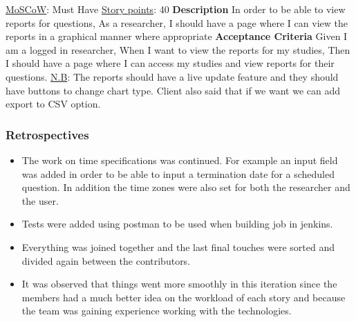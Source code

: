 \documentclass[12pt, a4paper]{report}
\begin{document}
\begin{tcolorbox}[width=\textwidth,colback={White},title={\textbf {Adding reports to website}},colbacktitle=grey,coltitle=black]
\underline{MoSCoW}: Must Have
\hfill
\underline {Story points}: 40
\newline
\newline
\blindtext \textbf{Description}
\newline
In order to be able to view reports for questions,
\newline
As a researcher,
\newline
I should have a page where I can view the reports in a graphical manner where appropriate
\newline
\newline
 \textbf{Acceptance Criteria}
 \newline
Given I am a logged in researcher,
\newline
When I want to view the reports for my studies,
\newline
Then I should have a page where I can access my studies and view reports for their questions.
\newline
\newline
\underline{N.B}:  The reports should have a live update feature and they should have buttons to change chart type. Client also said that if we want we can add export to CSV option.
\end{tcolorbox} 

\subsubsection{Retrospectives}
\begin{itemize}
    \item The work on time specifications was continued.
    For example an input field was added in order to be able to input a termination date for a scheduled question. In addition the time zones were also set for both the researcher and the user.
    \item Tests were added using postman to be used when building job in jenkins. 
    \item Everything was joined together and the last final touches were sorted and divided again between the contributors. 
    \item It was observed that things went more smoothly in this iteration since the members had a much better idea on the workload of each story and because the team was gaining experience working with the technologies.
\end{itemize}
\newpage
\end{document}
